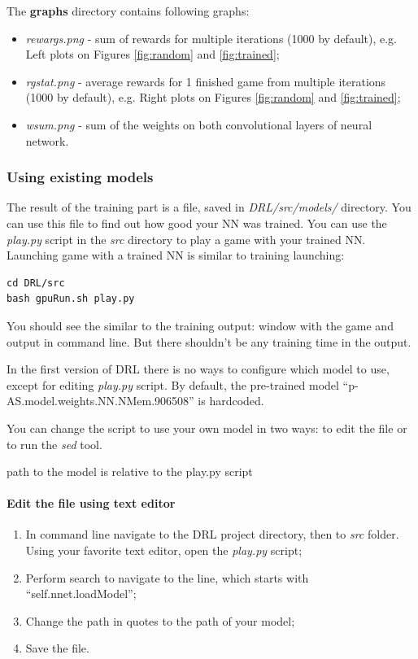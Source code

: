 \documentclass[a4paper,oneside,dvipsnames]{article}
\begin{document}
The \textbf{graphs} directory contains following graphs:
\begin{itemize}
\item \textit{rewargs.png} - sum of rewards for multiple iterations (1000 by default), e.g. Left plots on Figures \ref{fig:random} and \ref{fig:trained};
\item \textit{rgstat.png} - average rewards for 1 finished game from multiple iterations (1000 by default), e.g. Right plots on Figures \ref{fig:random} and \ref{fig:trained};
\item \textit{wsum.png} - sum of the weights on both convolutional layers of neural network.
\end{itemize}

\subsubsection[Using existing models]{Using existing models}
The result of the training part is a file, saved in \textit{DRL/src/models/} directory. You can use this file to find out how good your NN was trained. You can use the \textit{play.py} script in the \textit{src} directory to play a game with your trained NN. Launching game with a trained NN is similar to training launching:
\begin{verbatim}
cd DRL/src
bash gpuRun.sh play.py
\end{verbatim}

You should see the similar to the training output: window with the game and output in command line. But there shouldn't be any training time in the output.

In the first version of DRL there is no ways to configure which model to use, except for editing \textit{play.py} script. By default, the pre-trained model ``\raisebox{0.5ex}{\texttildelow}\raisebox{0.5ex}{\texttildelow}p-AS.model.weights.NN.NMem.906508'' is hardcoded.

You can change the script to use your own model in two ways: to edit the file or to run the \textit{sed} tool.

\begin{tcolorbox}[colbacktitle=red!40!white, coltitle=black, width=\linewidth, fonttitle=\bfseries, title=Note]
path to the model is relative to the play.py script
\end{tcolorbox}

\paragraph*{Edit the file using text editor}
\begin{enumerate}
\item In command line navigate to the DRL project directory, then to \textit{src} folder. Using your favorite text editor, open the \textit{play.py} script;
\item Perform search to navigate to the line, which starts with ``self.nnet.loadModel'';
\item Change the path in quotes to the path of your model;
\item Save the file.
\end{enumerate}
\end{document}
